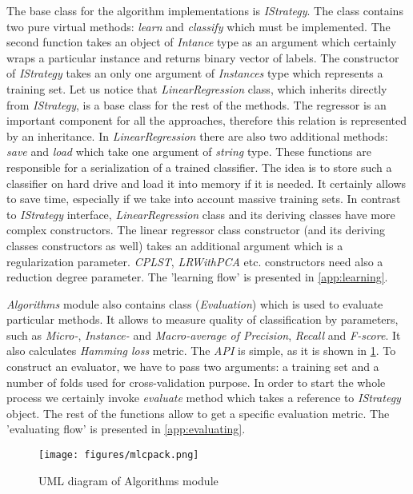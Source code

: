 The base class for the algorithm implementations is \textit{IStrategy}. The class contains two pure virtual methods: \textit{learn} and \textit{classify} which must be implemented. The second function takes an object of \textit{Intance} type as an argument which certainly wraps a particular instance and returns binary vector of labels. The constructor of \textit{IStrategy} takes an only one argument of \textit{Instances} type which represents a training set. Let us notice that \textit{LinearRegression} class, which inherits directly from \textit{IStrategy}, is a base class for the rest of the methods. The regressor is an important component for all the approaches, therefore this relation is represented by an inheritance. In \textit{LinearRegression} there are also two additional methods: \textit{save} and \textit{load} which take one argument of \textit{string} type. These functions are responsible for a serialization of a trained classifier. The idea is to store such a classifier on hard drive and load it into memory if it is needed. It certainly allows to save time, especially if we take into account massive training sets. In contrast to \textit{IStrategy} interface, \textit{LinearRegression} class and its deriving classes have more complex constructors. The linear regressor class constructor (and its deriving classes constructors as well) takes an additional argument which is a regularization parameter. \textit{CPLST}, \textit{LRWithPCA} etc. constructors need also a reduction degree parameter. The 'learning flow' is presented in \cref{app:learning}.

\textit{Algorithms} module also contains class (\textit{Evaluation}) which is used to evaluate particular methods. It allows to measure quality of classification by parameters, such as \textit{Micro-}, \textit{Instance-} and \textit{Macro-average of Precision}, \textit{Recall} and \textit{F-score}. It also calculates \textit{Hamming loss} metric. The \textit{API} is simple, as it is shown in \cref{fig:alg_sh}. To construct an evaluator, we have to pass two arguments: a training set and a number of folds used for cross-validation purpose. In order to start the whole process we certainly invoke \textit{evaluate} method which takes a reference to \textit{IStrategy} object. The rest of the functions allow to get a specific evaluation metric. The 'evaluating flow' is presented in \cref{app:evaluating}.

\begin{figure}
\centering
\caption{UML diagram of Algorithms module}
\label{fig:alg_sh}
\texttt{[image: figures/mlcpack.png]}
\end{figure}

